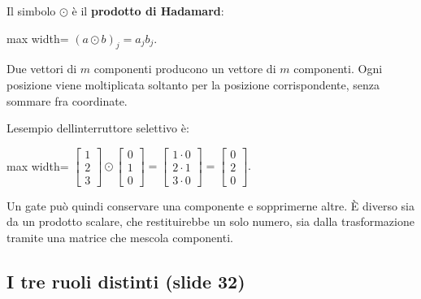 \documentclass[11pt,a4paper,oneside,openany]{book}
\begin{document}
Il simbolo \(\odot\) è il \textbf{prodotto di Hadamard}:

\begin{center}
\begin{adjustbox}{max width=\linewidth}
$\displaystyle \boxed{(a\odot b)_j=a_jb_j.}$
\end{adjustbox}
\end{center}

Due vettori di \(m\) componenti producono un vettore di \(m\) componenti. Ogni posizione viene moltiplicata soltanto per la posizione corrispondente, senza sommare fra coordinate.

L\textquotesingle esempio dell\textquotesingle interruttore selettivo è:

\begin{center}
\begin{adjustbox}{max width=\linewidth}
$\displaystyle \begin{bmatrix}1\\2\\3\end{bmatrix}\odot\begin{bmatrix}0\\1\\0\end{bmatrix}
=\begin{bmatrix}1\cdot0\\2\cdot1\\3\cdot0\end{bmatrix}
=\begin{bmatrix}0\\2\\0\end{bmatrix}.$
\end{adjustbox}
\end{center}

Un gate può quindi conservare una componente e sopprimerne altre. È diverso sia da un prodotto scalare, che restituirebbe un solo numero, sia dalla trasformazione tramite una matrice che mescola componenti.

\subsection{I tre ruoli distinti (slide 32)}\label{f03-r726}
\end{document}
